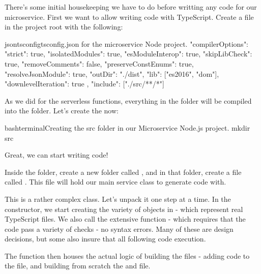 \documentclass[a4paper,headinclude=on,footinclude=on,12pt,oneside]{scrbook}
\begin{document}

There's some initial housekeeping we have to do before writting any code for our microservice. First we want to allow writing code with TypeScript. Create a  file in the project root with the following:

\begin{codeInput}{json}{tsconfig}{tsconfig.json for the microservice Node project.}
{
  "compilerOptions": {
    "strict": true,
    "isolatedModules": true,
    "esModuleInterop": true,
    "skipLibCheck": true,
    "removeComments": false,
    "preserveConstEnums": true,
    "resolveJsonModule": true,
    "outDir": "./dist",
    "lib": ["es2016", "dom"],
    "downlevelIteration": true
  },
  "include": ["./src/**/*"]
}
\end{codeInput}

As we did for the serverless functions, everything in the  folder will be compiled into the  folder. Let's create the  now:

\begin{codeInput}{bash}{terminal}{Creating the src folder in our Microservice Node.js project.}
mkdir src
\end{codeInput}

Great, we can start writing code!


Inside the  folder, create a new folder called , and in that folder, create a file called . This file will hold our main service class to generate code with.


This is a rather complex class. Let's unpack it one step at a time. In the constructor, we start creating the variety of  objects in  - which represent real TypeScript files. We also call the extensive  function - which requires that the code pass a variety of checks - no syntax errors. Many of these are design decisions, but some also insure that all following code execution.

The  function then houses the actual logic of building the files - adding code to the  file, and building from scratch the  and  file.
\end{document}
